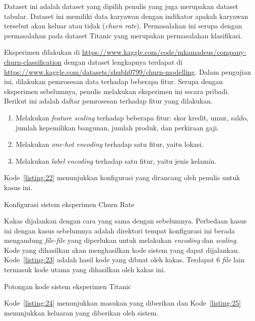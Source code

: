 Dataset ini adalah dataset yang dipilih penulis yang juga merupakan dataset tabular.
Dataset ini memiliki data karyawan dengan indikator apakah karyawan tersebut akan keluar atau tidak (\textit{churn rate}).
Permasalahan ini serupa dengan permasalahan pada dataset Titanic yang merupakan permasalahan klasifikasi.

Eksperimen dilakukan di \url{https://www.kaggle.com/code/mkamadeus/company-churn-classification} dengan dataset lengkapnya terdapat di \url{https://www.kaggle.com/datasets/shubh0799/churn-modelling}.
Dalam pengujian ini, dilakukan pemrosesan data terhadap beberapa fitur.
Serupa dengan eksperimen sebelumnya, penulis melakukan eksperimen ini secara pribadi.
Berikut ini adalah daftar pemrosesan terhadap fitur yang dilakukan.

\begin{enumerate}
	\item Melakukan \textit{feature scaling} terhadap beberapa fitur: skor kredit, umur, saldo, jumlah kepemilikan bangunan, jumlah produk, dan perkiraan gaji.
	\item Melakukan \textit{one-hot encoding} terhadap satu fitur, yaitu lokasi.
	\item Melakukan \textit{label encoding} terhadap satu fitur, yaitu jenis kelamin.
\end{enumerate}

Kode~\ref{listing:22} menunjukkan konfigurasi yang dirancang oleh penulis untuk kasus ini.

\begin{code}
	\caption{Konfigurasi sistem eksperimen Churn Rate}\label{listing:22}
\end{code}

Kakas dijalankan dengan cara yang sama dengan sebelumnya.
Perbedaan kasus ini dengan kasus sebelumnya adalah direktori tempat konfigurasi ini berada mengandung \textit{file-file} yang diperlukan untuk melakukan \textit{encoding} dan \textit{scaling}.
Kode yang dihasilkan akan menghasilkan kode sistem yang dapat dijalankan.
Kode~\ref{listing:23} adalah hasil kode yang dibuat oleh kakas.
Terdapat 6 \textit{file} lain termasuk kode utama yang dihasilkan oleh kakas ini.

\begin{code}
	\caption{Potongan kode sistem eksperimen Titanic}\label{listing:23}
\end{code}

Kode~\ref{listing:24} menunjukkan masukan yang diberikan dan Kode~\ref{listing:25} menunjukkan keluaran yang diberikan oleh sistem.


